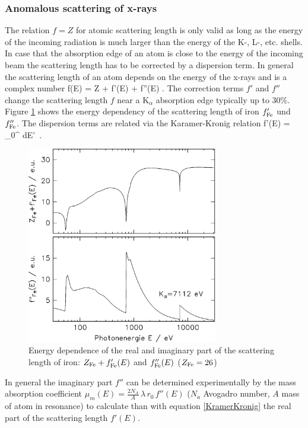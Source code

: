 \subsubsection{Anomalous scattering of x-rays}

The relation $f=Z$ for atomic scattering length is only valid as long as the energy of the incoming radiation
is much larger than the energy of the K-, L-, etc. shells. In case that the absorption edge of an atom is close
to the energy of the incoming beam the scattering length has to be corrected by a dispersion term.
In general the scattering length of an atom depends on the energy of the x-rays and is a complex number
\BE
f(E) = Z + f'(E) + \imath f''(E) \quad .
\EE
The correction terms $f'$ and $f''$ change the scattering length $f$ near a
K$_{\alpha}$ absorption edge typically up to 30\%.
Figure \ref{fpfppsketch} shows the energy dependency of the scattering length of iron
$f'_{\rm Fe}$ und $f''_{\rm Fe}$.
The dispersion terms are related via the Karamer-Kronig relation
\BE
f'(E) = \, \int_0^{\infty} dE'\,
        .
\label{KramerKronig}
\EE
\begin{figure}[htb]
\begin{center}
\includegraphics[width=0.7441\textwidth]{FEFPFPP.png}
\caption{Energy dependence of the real and imaginary part of the scattering length of iron:
$Z_{\rm Fe}+ f'_{\rm Fe}(E)$ and $f''_{\rm Fe}(E)$ ($Z_{\rm Fe}=26$)}
\label{fpfppsketch}
\end{center}
\end{figure}
In general the imaginary part $f''$ can be determined experimentally by the mass absorption
coefficient $\mu_m(E)=\frac{2N_A}{A}\, \lambda\, r_0\, f''(E)$ ($N_a$ Avogadro number, $A$
mass of atom in resonance) to calculate than with equation \ref{KramerKronig} the real part of the
scattering length $f'(E)$.

